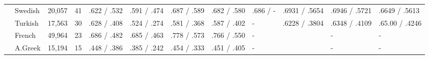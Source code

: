 \begin{landscape}
\begin{table}[ht]
\begin{tabular}{|l|l|l|l|p{1.5cm}|p{1.5cm}|p{1.5cm}|p{1.5cm}|p{1.5cm}|p{2cm}|p{2cm}|p{2cm}|}
        & Swedish    & 20,057  & 41   & .622 / .532   & .591 / .474   & .687 / .589   & .682 / .580   & .686 / -   & .6931 / .5654  & .6946 / .5721     & .6649 / .5613 \\
        & Turkish    & 17,563  & 30   & .628 / .408   & .524 / .274   & .581 / .368   & .587 / .402   & -          & .6228 / .3804  & .6348 / .4109    & .65.00 / .4246 \\ \hline %
        & French     & 49,964  & 23   & .686 / .482   & .685 / .463   & .778 / .573   & .766 / .550   & -          & & -               & -        \\
        & A.Greek    & 15,194  & 15   & .448 / .386   & .385 / .242   & .454 / .333  & .451 / .405    & -          & & -               & -        \\ \hline
    \end{tabular}
\end{table}
\end{landscape}

